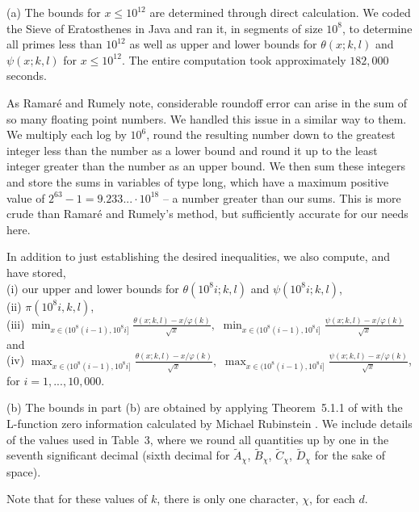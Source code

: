 \documentclass{jT}
\theoremstyle{definition}
\begin{document}
(a) The bounds for $x \leq 10^{12}$ are determined through direct calculation.
We coded the Sieve of Eratosthenes in Java and ran it, in segments of size $10^{8}$,
to determine all primes less than $10^{12}$ as well as upper and lower bounds for
$\theta(x; k, l)$ and $\psi(x; k, l)$ for $x \leq 10^{12}$. The entire computation
took approximately $182,000$ seconds.

As Ramar\'{e} and Rumely note, considerable roundoff error can arise in the sum of
so many floating point numbers. We handled this issue in a similar way to them.
We multiply each log by $10^{6}$, round the resulting number down to the greatest
integer less than the number as a lower bound and round it up to the least integer
greater than the number as an upper bound. We then sum these integers and store the
sums in variables of type long, which have a maximum positive value of $2^{63}-1 = 9.233... \cdot 10^{18}$
-- a number greater than our sums. This is more crude than Ramar\'{e} and Rumely's
method, but sufficiently accurate for our needs here.

In addition to just establishing the desired inequalities, we also compute, and have stored,\\
(i) our upper and lower bounds for $\theta(10^{8}i; k, l)$ and  $\psi(10^{8}i; k, l)$,\\
(ii) $\pi(10^{8}i, k, l)$,\\
(iii) $\displaystyle \min_{x \in (10^{8}(i-1), 10^{8}i]} \frac{\theta(x; k,l) - x/\varphi(k)}{\sqrt{x}},$
\hspace{3.0mm} $\displaystyle \min_{x \in (10^{8}(i-1), 10^{8}i]} \frac{\psi(x; k,l) - x/\varphi(k)}{\sqrt{x}}$ and \\
(iv) $\displaystyle \max_{x \in (10^{8}(i-1), 10^{8}i]} \frac{\theta(x; k,l) - x/\varphi(k)}{\sqrt{x}},$
\hspace{3.0mm} $\displaystyle \max_{x \in (10^{8}(i-1), 10^{8}i]} \frac{\psi(x; k,l) - x/\varphi(k)}{\sqrt{x}}$,\\
for $i=1,...,10,000$.

(b) The bounds in part (b) are obtained by applying Theorem~5.1.1 of \cite{RR} with the L-function zero
information calculated by Michael Rubinstein \cite{R}. We include details of the values
used in Table~3, where we round all quantities up by one in the seventh significant decimal
(sixth decimal for $\tilde{A}_{\chi}$, $\tilde{B}_{\chi}$, $\tilde{C}_{\chi}$, $\tilde{D}_{\chi}$
for the sake of space).

Note that for these values of $k$, there is only one character, $\chi$, for each $d$.
\end{document}
